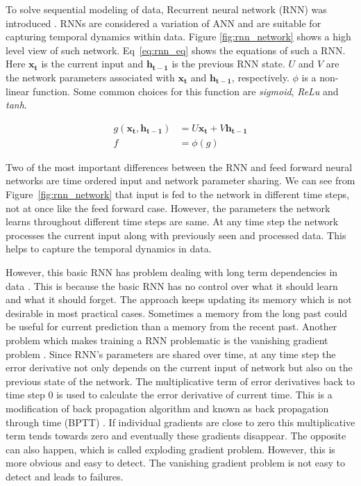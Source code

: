 \documentclass[10pt,twocolumn,letterpaper]{article}
\begin{document}
To solve sequential modeling of data, Recurrent neural network (RNN) was 
introduced \cite{DBLP:journals/corr/Lipton15}. RNNs are considered a  variation of ANN and are 
suitable for capturing temporal dynamics within 
data. Figure \ref{fig:rnn_network} shows a high level view of such network. 
Eq~\ref{eq:rnn_eq} shows the equations of such a  RNN. Here $\mathbf{x_t}$ is the current input and $\mathbf{h_{t-1}}$ is the previous RNN state. $U$ and $V$ are the network parameters associated with $\mathbf{x_t}$ and $\mathbf{h_{t-1}}$,
respectively. $\phi$ is a non-linear function. Some common choices for this function are \textit{sigmoid}, \textit{ReLu} and \textit{tanh}. 

\begin{equation}
\label{eq:rnn_eq}
\begin{aligned}
g(\mathbf{x_t}, \mathbf{h_{t-1}}) & = U\mathbf{x_t} + V\mathbf{h_{t-1}} \\ f & = \phi(g)
\end{aligned}
\end{equation} 

Two of the most important differences between the 
RNN and feed forward neural networks are time ordered input and network parameter sharing. We can see 
from Figure~\ref{fig:rnn_network} that input is fed to the network in different time steps, not at once like 
the feed forward case. However,
the parameters the network learns throughout different time steps are same. At any time step the network processes the 
current input along with 
previously seen and processed data. This helps to capture the temporal dynamics in data. 


However, this 
basic RNN has problem dealing with long term dependencies in data \cite{DBLP:journals/corr/abs-1211-5063}. This is because the 
basic RNN has no control over what it should learn and what it 
should forget. The approach keeps updating its memory which is not desirable in most practical cases. Sometimes a memory from the 
long past could be useful for current prediction than a memory from the recent past. Another problem which makes training a RNN problematic 
is the  vanishing gradient problem \cite{DBLP:journals/corr/abs-1211-5063}. Since RNN's parameters are shared over time, at any time step the error derivative not only depends on the current input of network but also on the previous state of the network. The 
multiplicative term of error derivatives back to time step 0 is used 
to calculate the error derivative of current time. This is a modification of back propagation algorithm and known as
back propagation through time (BPTT) \cite{58337}. If individual gradients are close to zero this multiplicative term tends towards 
zero and eventually these 
gradients disappear. The opposite can also happen, which is called exploding gradient problem.  However,
this is more obvious and easy to detect. The vanishing gradient problem is not easy to detect and leads to failures. 
\end{document}
